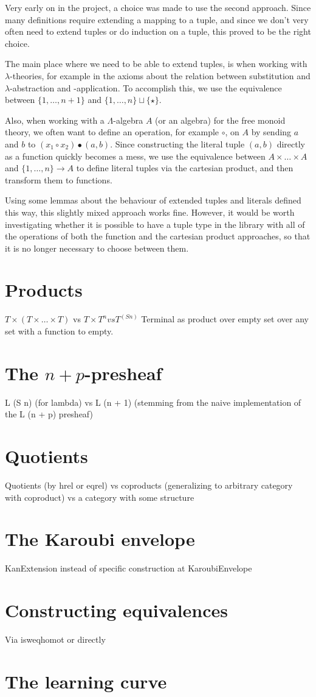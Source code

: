Very early on in the project, a choice was made to use the second approach. Since many definitions require extending a mapping to a tuple, and since we don't very often need to extend tuples or do induction on a tuple, this proved to be the right choice.

The main place where we need to be able to extend tuples, is when working with $ \lambda $-theories, for example in the axioms about the relation between substitution and $ \lambda $-abstraction and -application. To accomplish this, we use the equivalence between $ \{ 1, \dots, n + 1 \} $ and $ \{ 1, \dots, n \} \sqcup \{ \star \} $.

Also, when working with a $ \Lambda $-algebra $ A $ (or an algebra) for the free monoid theory, we often want to define an operation, for example $ \circ $, on $ A $ by sending $ a $ and $ b $ to $ (x_1 \circ x_2) \bullet (a, b) $. Since constructing the literal tuple $ (a, b) $ directly as a function quickly becomes a mess, we use the equivalence between $ A \times \dots \times A $ and $ \{ 1, \dots, n \} \to A $ to define literal tuples via the cartesian product, and then transform them to functions.

Using some lemmas about the behaviour of extended tuples and literals defined this way, this slightly mixed approach works fine. However, it would be worth investigating whether it is possible to have a tuple type in the library with all of the operations of both the function and the cartesian product approaches, so that it is no longer necessary to choose between them.

\section{Products}
$ T \times (T \times \dots \times T) $ vs $ T \times T^n vs T^(S n) $
Terminal as product over empty set
over any set with a function to empty.

\section{The \texorpdfstring{$ n + p $}{n + p}-presheaf}
L (S n) (for lambda) vs L (n + 1) (stemming from the naive implementation of the L (n + p) presheaf)

\section{Quotients}
Quotients (by hrel or eqrel) vs coproducts (generalizing to arbitrary category with coproduct) vs a category with some structure

\section{The Karoubi envelope}
KanExtension instead of specific construction at KaroubiEnvelope

\section{Constructing equivalences}
Via isweqhomot or directly

\section{The learning curve}
